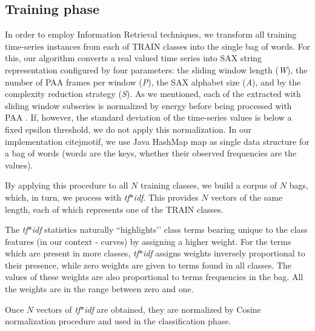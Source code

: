 \documentclass{llncs}
\begin{document}
\subsection{Training phase}
In order to employ Information Retrieval techniques, we transform all training time-series instances
from each of TRAIN classes into the single bag of words. For this, our algorithm converts a real
valued time series into SAX string representation configured by four parameters: the sliding window
length (\textit{W}), the number of PAA frames per window (\textit{P}), the SAX alphabet size
(\textit{A}), and by the complexity reduction strategy (\textit{S}). 
As we mentioned, each of the extracted with sliding window subseries is normalized by energy before
being processed with PAA \cite{goldin_kanellakis}. If, however, the standard deviation of the
time-series values is below a fixed epsilon threshold, we do not apply this normalization.
In our implementation cite{jmotif}, we use Java HashMap map as single data structure for a bag
of words (words are the keys, whether their observed frequencies are the values).

By applying this procedure to all $N$ training classes, we build a corpus of $N$ bags, which, in
turn, we process with \textit{tf$\ast$idf}. This provides $N$ vectors of the same length, each of
which represents one of the TRAIN classes.

The \textit{tf$\ast$idf} statistics naturally ``highlights’’ class terms bearing unique to the class
features (in our context - curves) by assigning a higher weight. For the terms which are 
present in more classes, \textit{tf$\ast$idf} assigns weights inversely proportional to their
presence, while zero weights are given to terms found in all classes. The values of these weights
are also proportional to terms frequencies in the bag. All the weights are in the range between
zero and one.

Once $N$ vectors of \textit{tf$\ast$idf} are obtained, they are normalized by Cosine
normalization procedure and used in the classification phase.
\end{document}
